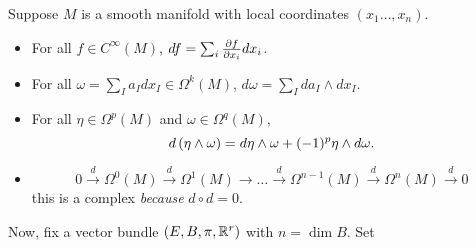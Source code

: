\documentclass[main.tex]{subfiles}
\begin{document}
         Suppose $M$ is a smooth manifold with local coordinates $(x_1 \dots, x_n)$.
        \begin{note}
            \begin{itemize}
                \item For all $f \in C^\infty(M)$, $df = \sum_i \frac{ \partial f }{ \partial x_i } dx_i$.
                \item For all $\omega = \sum_I a_I dx_I \in \Omega^k(M)$, $d\omega = \sum_I da_I \wedge dx_I$.
                \item {} For all $\eta \in \Omega^p(M)$ and $\omega \in \Omega^q(M)$,
                \[
                d\left( \eta \wedge \omega  \right) = d\eta \wedge \omega + (-1)^{p} \eta \wedge d \omega.
                \]
                \item {}
                \[
                0 \overset{d}{\to} \Omega^0(M) \overset{d}{\to}  \Omega^1(M) \to  \dots \overset{d}{\to}  \Omega^{n-1}(M) \overset{d}{\to}  \Omega^n(M) \overset{d}{\to}  0
                \] this is a complex {\it because} $d \circ d = 0$.
            \end{itemize}

        \end{note}

    Now, fix a vector bundle $(E, B ,\pi, \mathbb{R}^r)$ with $n  = \dim B$. Set
\end{document}
